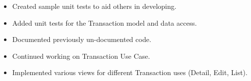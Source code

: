 \documentclass{article}
\begin{document}
  \begin{itemize}
    \item Created sample unit tests to aid others in developing.
    \item Added unit tests for the Transaction model and data access.
  \end{itemize}
	
  \begin{itemize}
    \item Documented previously un-documented code.
  \end{itemize}
  
  \begin{itemize}
    \item Continued working on Transaction Use Case.
    \item Implemented various views for different Transaction uses (Detail, Edit, List).
	\end{itemize}
	
\end{document}
